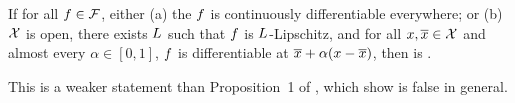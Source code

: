 \begin{proposition}
If for all $f\in\mathcal{F}$, either
(a) the $f$ is continuously differentiable everywhere; or (b)
$\mathcal{X}$ is open, there exists $L$ such that $f$ is $L$-Lipschitz, and for all $x,\overline{x}\in\mathcal{X}$ and almost every $\alpha\in[0,1]$, $f$ is differentiable at $\overline{x}+\alpha(x-\overline{x})$,
%
%
%
%
%
then \intgrad{} is \completename{}.
\end{proposition}

\begin{remark}
This is a weaker statement than Proposition~1 of \citet{sundararajan17integrated}, which \citet{lerma21integrated} show is false in general.
\end{remark}

